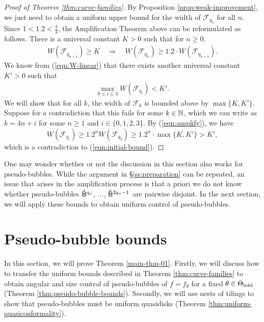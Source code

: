 \documentclass{amsart}
\begin{document}
\begin{proof}[Proof of Theorem \ref{thm:curve-families}]
    By Proposition \ref{prop:weak-improvement}, we just need to obtain a uniform upper bound for the width of $\mathcal{F}_{q_n}$ for all $n$.
    Since $1 < 1.2 < \frac{4}{3}$, the Amplification Theorem above can be reformulated as follows.
    There is a universal constant $K>0$ such that for $n \geq 0$,
    \begin{align}
    \label{eqn:amplify}
        W(\mathcal{F}_{q_{n+4}}) \geq K \quad \Longrightarrow \quad W(\mathcal{F}_{q_{n}}) \geq 1.2 \cdot W(\mathcal{F}_{q_{n+4}}).
    \end{align}
    We know from (\ref{eqn:W-linear}) that there exists another universal constant $K'>0$ such that 
    \begin{align}
    \label{eqn:initial-bound}
        \max_{0\leq i \leq 3} W(\mathcal{F}_{q_i}) < K'.
    \end{align}
    We will show that for all $k$, the width of $\mathcal{F}_k$ is bounded above by $\max\{K,K'\}$.
    Suppose for a contradiction that this fails for some $k \in \mathbb{N}$, which we can write as $k=4n+i$ for some $n \geq 1$ and $i \in \{0,1,2,3\}$. 
    By (\ref{eqn:amplify}), we have 
    \[
        W(\mathcal{F}_{q_i}) \geq 1.2^n W(\mathcal{F}_{q_k}) \geq 1.2^n \cdot \max\{K,K'\} > K',
    \]
    which is a contradiction to (\ref{eqn:initial-bound}).
\end{proof}

\begin{remark}
    One may wonder whether or not the discussion in this section also works for pseudo-bubbles. 
    While the argument in \S\ref{ss:preparation} can be repeated, an issue that arises in the amplification process is that a priori we do not know whether pseudo-bubbles $\hat{\mathsf{B}}^{q_n}$, $\ldots$, $\hat{\mathsf{B}}^{2q_n-1}$ are pairwise disjoint.
    In the next section, we will apply these bounds to obtain uniform control of pseudo-bubbles.
\end{remark}


\section{Pseudo-bubble bounds}
\label{sec:pseudo-bubble-bounds}

In this section, we will prove Theorem \ref{main-thm-01}. 
Firstly, we will discuss how to transfer the uniform bounds described in Theorem \ref{thm:curve-families} to obtain angular and size control of pseudo-bubbles of $f = f_\theta$ for a fixed $\theta \in \Theta_{\textnormal{bdd}}$ (Theorem \ref{thm:pseudo-bubble-bounds}). 
Secondly, we will use nests of tilings to show that pseudo-bubbles must be uniform quasidisks (Theorem \ref{thm:uniform-quasiconformality}).
\end{document}
